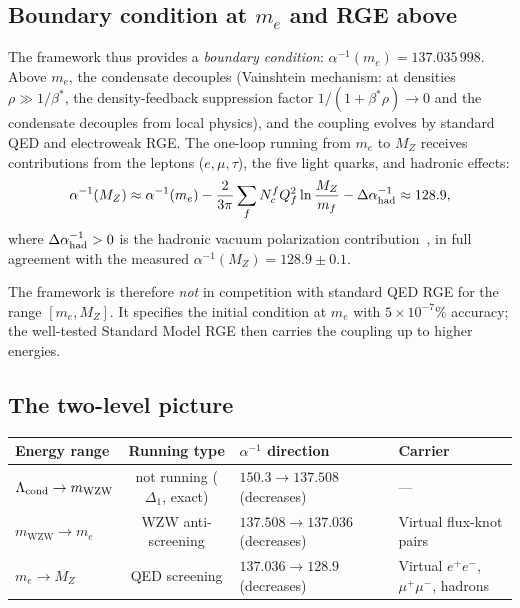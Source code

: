 \documentclass[11pt,a4paper]{article}
\theoremstyle{definition}
\theoremstyle{remark}
\newcommand{\bst}{\beta^{*}}
\newcommand{\aInv}{\alpha^{-1}}
\newcommand{\mWZW}{m_{\mathrm{WZW}}}
\begin{document}
\subsection{Boundary condition at $m_e$ and RGE above}

The framework thus provides a \emph{boundary condition}:
$\aInv(m_e) = 137.035\,998$.
Above $m_e$, the condensate decouples (Vainshtein mechanism: at densities
$\rho \gg 1/\bst$, the density-feedback suppression factor
$1/(1+\bst\rho)\to 0$ and the condensate decouples from local physics),
and the coupling evolves by standard QED and electroweak RGE.
The one-loop running from $m_e$ to $M_Z$ receives contributions from
the leptons ($e, \mu, \tau$), the five light quarks, and hadronic effects:
\begin{equation}
  \aInv(M_Z)
  \approx \aInv(m_e)
         - \frac{2}{3\pi}\sum_f N_c^f Q_f^2 \ln\frac{M_Z}{m_f}
         - \Delta\alpha^{-1}_{\rm had}
  \approx 128.9,
  \label{P4:eq:running_to_MZ}
\end{equation}
where $\Delta\alpha^{-1}_{\rm had} > 0$ is the hadronic vacuum polarization
contribution~\cite{PDG2024}, in full agreement with the measured
$\aInv(M_Z) = 128.9 \pm 0.1$.
 
The framework is therefore \emph{not} in competition with standard QED RGE
for the range $[m_e, M_Z]$.  It specifies the initial condition at $m_e$
with $5\times10^{-7}\%$ accuracy; the well-tested Standard Model RGE then carries
the coupling up to higher energies.

\subsection{The two-level picture}

\begin{center}
\renewcommand{\arraystretch}{1.3}
\begin{tabular}{lcll}
\toprule
Energy range & Running type & $\aInv$ direction & Carrier \\
\midrule
$\Lambda_{\rm cond} \to \mWZW$ & not running ($\Delta_1$, exact) & $150.3 \to 137.508$ (decreases) & --- \\
$\mWZW \to m_e$ & WZW anti-screening & $137.508 \to 137.036$ (decreases) & Virtual flux-knot pairs \\
$m_e \to M_Z$ & QED screening & $137.036 \to 128.9$ (decreases) & Virtual $e^+e^-$, $\mu^+\mu^-$, hadrons \\
\bottomrule
\end{tabular}
\end{center}
\end{document}

